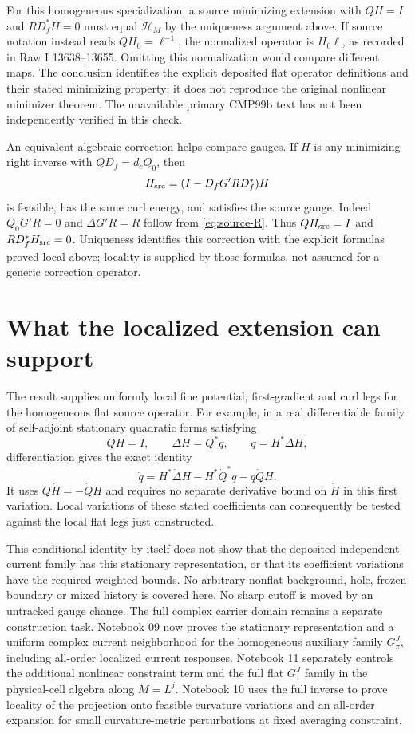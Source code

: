 \documentclass[11pt]{article}
\theoremstyle{remark}
\newcommand{\HH}{\mathcal H}
\begin{document}
For this homogeneous specialization, a source minimizing extension
with $QH=I$ and $RD_f^*H=0$ must equal $\HH_M$ by the uniqueness
argument above. If source notation instead reads $QH_0=\ell^{-1}$,
the normalized operator is $H_0\ell$, as recorded in Raw I
13638--13655. Omitting this normalization would compare different
maps. The conclusion identifies the explicit deposited flat
operator definitions and their stated minimizing property; it
does not reproduce the original nonlinear minimizer theorem.
The unavailable primary CMP99b text has not been independently
verified in this check.

An equivalent algebraic correction helps compare gauges. If $H$
is any minimizing right inverse with $QD_f=d_cQ_0$, then
\[
 H_{\rm src}=(I-D_fG'RD_f^*)H
\]
is feasible, has the same curl energy, and satisfies the source
gauge. Indeed $Q_0G'R=0$ and $\Delta G'R=R$ follow from
\eqref{eq:source-R}. Thus $QH_{\rm src}=I$ and
$RD_f^*H_{\rm src}=0$. Uniqueness identifies this correction
with the explicit formulas proved local above; locality is supplied
by those formulas, not assumed for a generic correction operator.

\section{What the localized extension can support}

The result supplies uniformly local fine potential, first-gradient
and curl legs for the homogeneous flat source operator. For example,
in a real differentiable family of self-adjoint stationary quadratic
forms satisfying
\[
 QH=I,\qquad \Delta H=Q^*q,\qquad q=H^*\Delta H,
\]
differentiation gives the exact identity
\[
 \dot q=H^*\dot\Delta H-H^*\dot Q^*q-q\dot QH.
\]
It uses $Q\dot H=-\dot QH$ and requires no separate derivative
bound on $\dot H$ in this first variation. Local variations of
these stated coefficients can consequently be tested against the
local flat legs just constructed.

This conditional identity by itself does not show that the deposited
independent-current family has this stationary representation, or
that its coefficient variations have the required weighted bounds.
No arbitrary nonflat background, hole, frozen boundary or mixed
history is covered here. No sharp cutoff is moved by an untracked
gauge change. The full complex carrier domain remains a separate
construction task. Notebook 09 now proves the stationary
representation and a uniform complex current neighborhood for the
homogeneous auxiliary family $G_\pi^J$, including all-order localized
current responses. Notebook 11 separately controls the additional
nonlinear constraint term and the full flat $G_1^J$ family in the
physical-cell algebra along $M=L^j$. Notebook 10 uses the full inverse to prove
locality of the projection onto feasible curvature variations and
an all-order expansion for small curvature-metric perturbations at
fixed averaging constraint.
\end{document}
